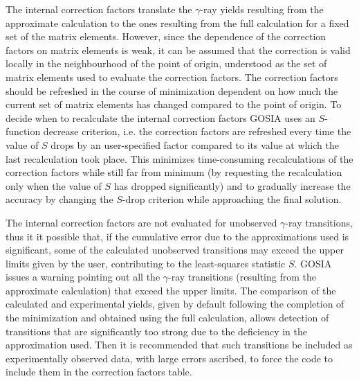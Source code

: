 \documentclass[10pt]{article}
\begin{document}
The internal correction factors translate the $\gamma$-ray yields resulting from the approximate calculation to the ones resulting from the full calculation for a fixed set of the matrix elements. However, since the dependence of the correction factors on matrix elements is weak, it can be assumed that the correction is valid locally in the neighbourhood of the point of origin, understood as the set of matrix elements used to evaluate the correction factors. The correction factors should be refreshed in the course of minimization dependent on how much the current set of matrix elements has changed compared to the point of origin. To decide when to recalculate the internal correction factors GOSIA uses an $S$-function decrease criterion, i.e. the correction factors are refreshed every time the value of $S$ drops by an user-specified factor compared to its value at which the last recalculation took place. This minimizes time-consuming recalculations of the correction factors while still far from minimum (by requesting the recalculation only when the value of $S$ has dropped significantly) and to gradually increase the accuracy by changing the $S$-drop criterion while approaching the final solution.

The internal correction factors are not evaluated for unobserved $\gamma$-ray transitions, thus it it possible that, if the cumulative error due to the approximations used is significant, some of the calculated unobserved transitions may exceed the upper limits given by the user, contributing to the least-squares statistic $S$. GOSIA issues a warning pointing out all the $\gamma$-ray transitions (resulting from the approximate calculation) that exceed the upper limits. The comparison of the calculated and experimental yields, given by default following the completion of the minimization and obtained using the full calculation, allows detection of transitions that are significantly too strong due to the deficiency in the approximation used. Then it is recommended that such transitions be included as experimentally observed data, with large errors ascribed, to force the code to include them in the correction factors table.
\end{document}
